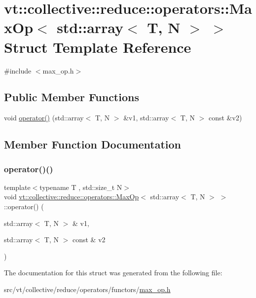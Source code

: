 \hypertarget{structvt_1_1collective_1_1reduce_1_1operators_1_1_max_op_3_01std_1_1array_3_01_t_00_01_n_01_4_01_4}{}\section{vt\+:\+:collective\+:\+:reduce\+:\+:operators\+:\+:Max\+Op$<$ std\+:\+:array$<$ T, N $>$ $>$ Struct Template Reference}
\label{structvt_1_1collective_1_1reduce_1_1operators_1_1_max_op_3_01std_1_1array_3_01_t_00_01_n_01_4_01_4}


{\ttfamily \#include $<$max\+\_\+op.\+h$>$}

\subsection*{Public Member Functions}
\begin{DoxyCompactItemize}
\item 
void \hyperlink{structvt_1_1collective_1_1reduce_1_1operators_1_1_max_op_3_01std_1_1array_3_01_t_00_01_n_01_4_01_4_ab2333f6b5a57ade6e25d50cd788b5bf7}{operator()} (std\+::array$<$ T, N $>$ \&v1, std\+::array$<$ T, N $>$ const \&v2)
\end{DoxyCompactItemize}


\subsection{Member Function Documentation}
\mbox{\label{structvt_1_1collective_1_1reduce_1_1operators_1_1_max_op_3_01std_1_1array_3_01_t_00_01_n_01_4_01_4_ab2333f6b5a57ade6e25d50cd788b5bf7}} 
\subsubsection{\texorpdfstring{operator()()}{operator()()}}
{\footnotesize\ttfamily template$<$typename T , std\+::size\+\_\+t N$>$ \\
void \hyperlink{structvt_1_1collective_1_1reduce_1_1operators_1_1_max_op}{vt\+::collective\+::reduce\+::operators\+::\+Max\+Op}$<$ std\+::array$<$ T, N $>$ $>$\+::operator() (\begin{DoxyParamCaption}\item[{std\+::array$<$ T, N $>$ \&}]{v1,  }\item[{std\+::array$<$ T, N $>$ const \&}]{v2 }\end{DoxyParamCaption})\hspace{0.3cm}{\ttfamily [inline]}}



The documentation for this struct was generated from the following file\+:\begin{DoxyCompactItemize}
\item 
src/vt/collective/reduce/operators/functors/\hyperlink{max__op_8h}{max\+\_\+op.\+h}\end{DoxyCompactItemize}
